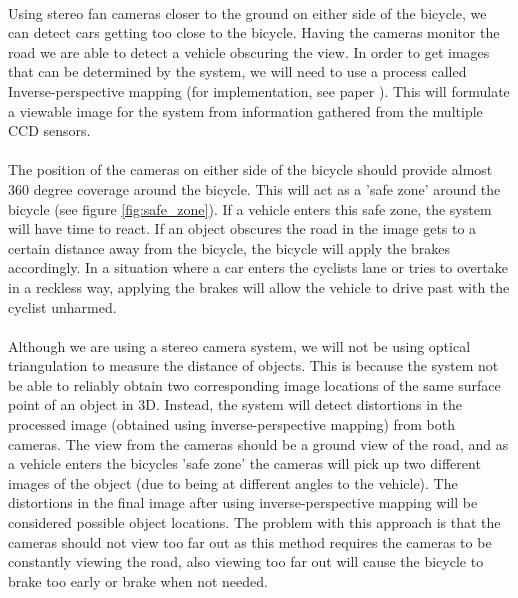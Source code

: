 \documentclass[a4paper]{report}
\begin{document}
{\paragraph{}Using stereo fan cameras closer to the ground on either side of the bicycle, we can detect cars getting too close to the bicycle. Having the cameras monitor the road we are able to detect a vehicle obscuring the view. In order to get images that can be determined by the system, we will need to use a process called Inverse-perspective
mapping (for implementation, see paper \cite{inverse-perspective_mapping}). This will formulate a viewable image for the system from information gathered from the multiple CCD sensors. 

\paragraph{}The position of the cameras on either side of the bicycle should provide almost 360 degree coverage around the bicycle. This will act as a 'safe zone' around the bicycle (see figure \ref{fig:safe_zone}). If a vehicle enters this safe zone, the system will have time to react. If an object obscures the road in the image gets to a certain distance away from the bicycle, the bicycle will apply the brakes accordingly. In a situation where a car enters the cyclists lane or tries to overtake in a reckless way, applying the brakes will allow the vehicle to drive past with the cyclist unharmed.

\paragraph{}Although we are using a stereo camera system, we will not be using optical triangulation to measure the distance of objects. This is because the system not be able to reliably obtain two corresponding image locations of the same surface point of an object in 3D. Instead, the system will detect distortions in the processed image (obtained using inverse-perspective mapping) from both cameras. The view from the cameras should be a ground view of the road, and as a vehicle enters the bicycles 'safe zone' the cameras will pick up two different images of the object (due to being at different angles to the vehicle). The distortions in the final image after using inverse-perspective mapping will be considered possible object locations. The problem with this approach is that the cameras should not view too far out as this method requires the cameras to be constantly viewing the road, also viewing too far out will cause the bicycle to brake too early or brake when not needed.

}
\end{document}
